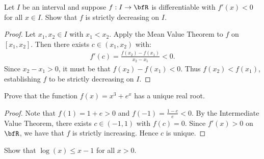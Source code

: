 \documentclass[11pt,twoside,openany]{memoir}
\begin{document}
    \begin{exercise}
        Let $I$ be an interval and suppose $f:I\rightarrow \bfR$ is differentiable with $f'(x) < 0$ for all $x \in I$. Show that $f$ is strictly decreasing on $I$.
    \end{exercise}
       \begin{proof}
            Let $x_1,x_2 \in I$ with $x_1 < x_2$. Apply the Mean Value Theorem to $f$ on $[x_1,x_2]$. Then there exists $c \in (x_1,x_2)$ with:
                \begin{equation*}
                \begin{split}
                    f'(c) = \frac{f(x_2) -f(x_1)}{x_2 - x_1} < 0.
                \end{split}
                \end{equation*}
            Since $x_2 - x_1 > 0$, it must be that $f(x_2) - f(x_1) < 0$. Thus $f(x_2) < f(x_1)$, establishing $f$ to be strictly decreasing on $I$.
        \end{proof}
    \begin{exercise}
        Prove that the function $f(x) = x^3 + e^x$ has a unique real root. 
    \end{exercise}
        \begin{proof}
            Note that $f(1) = 1 + e > 0$ and $f(-1) = \frac{1-e}{e} < 0$. By the Intermediate Value Theorem, there exists $c \in (-1,1)$ with $f(c) = 0$. Since $f'(x) > 0$ on $\bfR$, we have that $f$ is strictly increasing. Hence $c$ is unique.
        \end{proof}
    \begin{exercise}
        Show that $\log(x) \leq x-1$ for all $x > 0$.
    \end{exercise}
\end{document}
